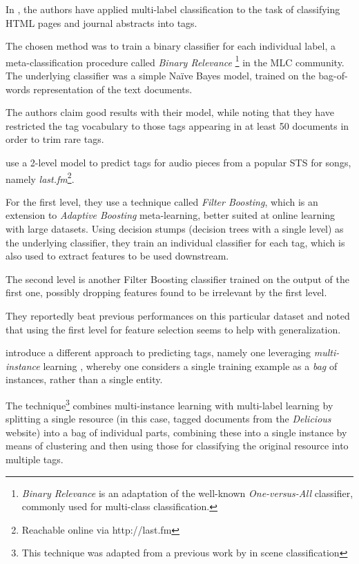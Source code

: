 In \cite{katakis_etal_2008}, the authors have applied multi-label classification to the task of classifying HTML pages and journal abstracts into tags.

The chosen method was to train a binary classifier for each individual label, a meta-classification procedure called \textit{Binary Relevance} \footnote{\textit{Binary Relevance} is an adaptation of the well-known \textit{One-versus-All} \citep{rifkin_klautau_2004} classifier, commonly used for multi-class classification.} in the MLC community. The underlying classifier was a simple Naïve Bayes model, trained on the bag-of-words representation of the text documents.

The authors claim good results with their model, while noting that they have restricted the tag vocabulary to those tags appearing in at least 50 documents in order to trim rare tags.

\citet{bertin-mahieux_etal_2008} use a 2-level model to predict tags for audio pieces from a popular STS for songs, namely \textit{last.fm}\footnote{Reachable online via http://last.fm}.

For the first level, they use a technique called \textit{Filter Boosting}, which is an extension to \textit{Adaptive Boosting} meta-learning, better suited at online learning with large datasets. 
Using decision stumps (decision trees with a single level) as the underlying classifier, they train an individual classifier for each tag, which is also used to extract features to be used downstream.

The second level is another Filter Boosting classifier trained on the output of the first one, possibly dropping features found to be irrelevant by the first level.

They reportedly beat previous performances on this particular dataset and noted that using the first level for feature selection seems to help with generalization.

\cite{shen_etal_2009} introduce a different approach to predicting tags, namely one leveraging \textit{multi-instance} learning \citep{dietterich_etal_1997}, whereby one considers a single training example as a \textit{bag} of instances, rather than a single entity.

The technique\footnote{This technique was adapted from a previous work by \cite{zhou_zhang_2006} in scene classification} combines multi-instance learning with multi-label learning by splitting a single resource (in this case, tagged documents from the \textit{Delicious} website) into a bag of individual parts, combining these into a single instance by means of clustering and then using those for classifying the original resource into multiple tags.

